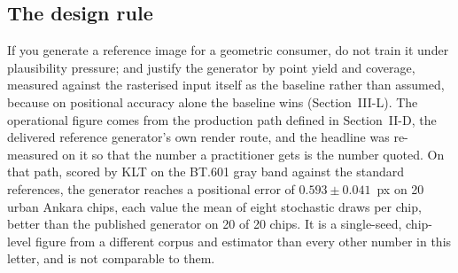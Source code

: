 %
%
%


\subsection{The design rule}

If you generate a reference image for a geometric consumer, do not train it under
plausibility pressure; and justify the generator by point yield and coverage, measured
against the rasterised input itself as the baseline rather than assumed, because on
positional accuracy alone the baseline wins (Section~III-L). The operational figure comes from the production path defined in Section~II-D, the
delivered reference generator's own render route, and the headline was re-measured on it
so that the number a practitioner gets is the number quoted. On that path, scored by KLT on the
BT.601 gray band against the standard references, the \Lone{} generator reaches a
positional error of $0.593 \pm 0.041$~px on 20 urban Ankara chips, each value the mean of
eight stochastic draws per chip, better than the published generator on 20 of 20 chips.
It is a single-seed, chip-level figure from a different corpus and estimator than every
other number in this letter, and is not comparable to them.

